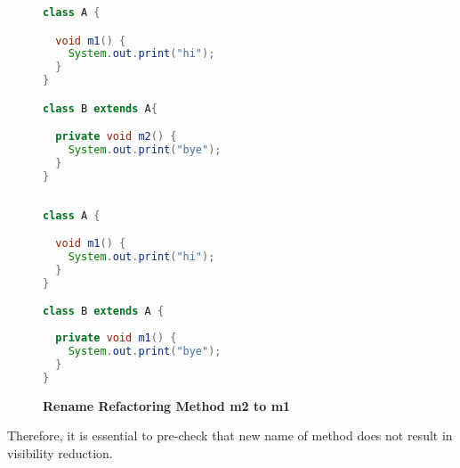 \begin{figure}[th]
\centering
\begin{minipage}[t]{0.47\linewidth}
\begin{lstlisting}[language=java, basicstyle=\scriptsize\ttfamily,frame=single]
class A {

  void m1() {
    System.out.print("hi");
  }
}

class B extends A{

  private void m2() {
    System.out.print("bye");
  }	
}
 
\end{lstlisting}
\end{minipage}
\hfill
\begin{minipage}[t]{0.47\linewidth}
\begin{lstlisting}[language=java, basicstyle=\scriptsize\ttfamily,frame=single]
class A {

  void m1() {
    System.out.print("hi");
  }
}

class B extends A {
 
  private void m1() {
    System.out.print("bye");
  }	
}

\end{lstlisting}
\end{minipage}
\caption{\textbf{Rename Refactoring Method m2 to m1}}
\label{fig:RmR3}
\end{figure}

Therefore, it is essential to pre-check that new name of method does not result in visibility reduction. 